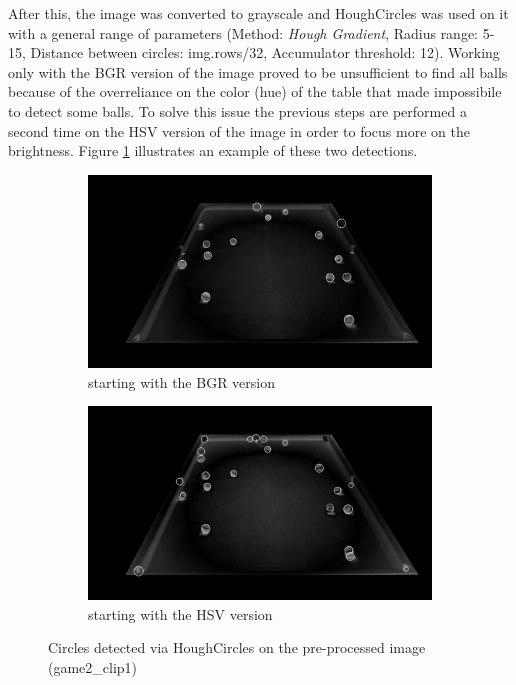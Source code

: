 After this, the image was converted to grayscale and HoughCircles was used on it with a general range
of parameters (Method: \textit{Hough Gradient}, Radius range: 5-15, Distance between circles: img.rows/32, Accumulator threshold: 12).
Working only with the BGR version of the image proved to be unsufficient to find all balls because of the 
overreliance on the color (hue) of the table that made impossibile to detect some balls. To solve this issue
the previous steps are performed a second time on the HSV version of the image in order to focus more on 
the brightness. Figure \ref{fig:circles} illustrates an example of these two detections. \\
\begin{figure}[h]
    \centering
    \begin{subfigure}[b]{0.45\textwidth}
        \centering
        \includegraphics[width=\textwidth]{imgs/ball_localization/circlesBGR.jpg}
        \caption{starting with the BGR version}
    \end{subfigure}
    \hspace{0.05\textwidth}
    \begin{subfigure}[b]{0.45\textwidth}
        \centering
        \includegraphics[width=\textwidth]{imgs/ball_localization/circlesHSV.jpg}
        \caption{starting with the HSV version}
    \end{subfigure}
    \caption{Circles detected via HoughCircles on the pre-processed image (game2\_clip1)}
    \label{fig:circles}
\end{figure}

